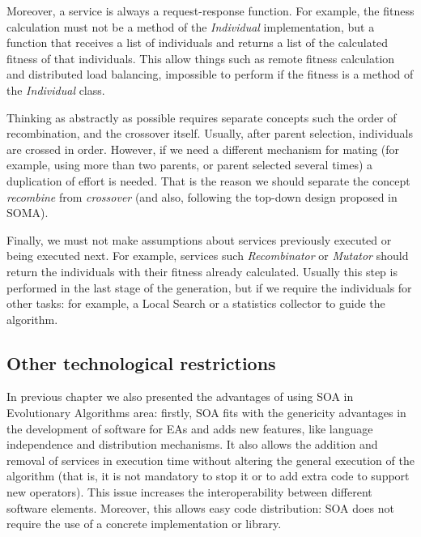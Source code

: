 Moreover, a service is always a request-response function. For
example, the fitness calculation must not be a method of the {\em
  Individual} implementation, but a function that receives a list of
individuals and returns a list of the calculated fitness of that
individuals. This allow things such as remote fitness calculation and
distributed load balancing, impossible to perform if the fitness is a
method of the {\em Individual} class. %

Thinking as abstractly as possible requires separate concepts such the order of recombination, and the crossover itself. Usually, after parent selection, individuals are crossed in order. However, if we need a different mechanism for mating (for example, using more than two parents, or parent selected several times) a duplication of effort is needed. That is the reason we should separate the concept {\em recombine} from {\em crossover} (and also, following the top-down design proposed in SOMA). 

Finally, we must not make assumptions about services previously executed or being executed next. For example, services such {\em Recombinator} or {\em Mutator} should return the individuals with their fitness already calculated. Usually this step is performed in the last stage of the generation, but if we require the individuals for other tasks: for example, a Local Search or a statistics collector to guide the algorithm.

\subsection{Other technological restrictions}

In previous chapter we also presented the advantages of using SOA in Evolutionary Algorithms area: firstly, SOA fits with the genericity advantages in the development of software for EAs \cite{GENERICITY05} and adds new features, like language independence and  distribution mechanisms. It also allows the addition and removal of services in execution time without altering the general execution of the algorithm (that is, it is not mandatory to stop it or to add extra code to support new operators). This issue increases the interoperability between different software elements. Moreover, this allows easy code distribution: SOA does not require the use of a concrete implementation or library.

